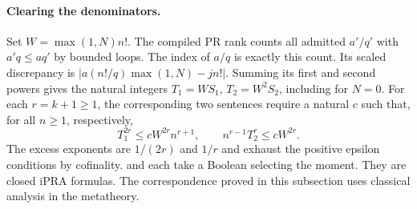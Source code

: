\paragraph{Clearing the denominators.}
Set \(W=\max(1,N)n!\). The compiled PR rank counts all admitted \(a'/q'\) with \(a'q\le aq'\) by bounded loops. The index of \(a/q\) is exactly this count. Its scaled discrepancy is \(\left|a(n!/q)\max(1,N)-j n!\right|\). Summing its first and second powers gives the natural integers \(T_1=W S_1\), \(T_2=W^2S_2\), including for \(N=0\). For each \(r=k+1\ge1\), the corresponding two sentences require a natural \(c\) such that, for all \(n\ge1\), respectively,
\[
 T_1^{2r}\le c W^{2r} n^{r+1},
 \qquad n^{r-1}T_2^r\le c W^{2r}.
\]
The excess exponents are \(1/(2r)\) and \(1/r\) and exhaust the positive epsilon conditions by cofinality.  and  each take a Boolean selecting the moment. They are closed iPRA formulas. The correspondence proved in this subsection uses classical analysis in the metatheory.
